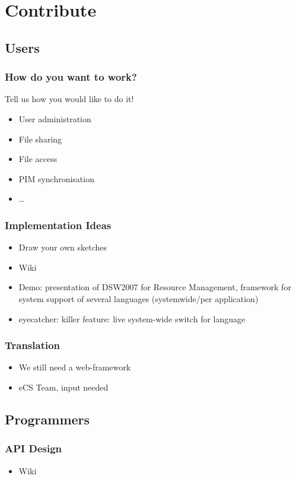 \documentclass{beamer}
\begin{document}
\section{Contribute}

\subsection{Users}

\begin{frame}
\frametitle{How do you want to work?}
Tell us how you would like to do it!
\begin{itemize}
  \item User administration
  \item File sharing
  \item File access
  \item PIM synchronisation
  \item \ldots
\end{itemize}
\end{frame}

\begin{frame}
\frametitle{Implementation Ideas}
\begin{itemize}
  \item Draw your own sketches
  \item Wiki
  \item Demo: presentation of DSW2007 for Resource Management, framework for 
  system support of several languages (systemwide/per application)
  \item eyecatcher: killer feature: live system-wide switch for language
\end{itemize}
\end{frame}

\begin{frame}
\frametitle{Translation}
\begin{itemize}
  \item We still need a web-framework
  \item eCS Team, input needed
\end{itemize}
\end{frame}

\subsection{Programmers}

\begin{frame}
\frametitle{API Design}
\begin{itemize}
  \item Wiki
\end{itemize}
\end{frame}
\end{document}
